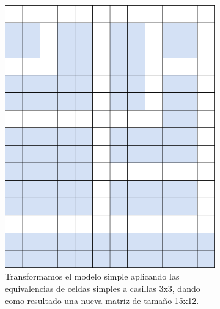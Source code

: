     \begin{figure}[H]
    \centering
        \begin{subfigure}[b]{0.95\textwidth}
            \centering
            \includegraphics[scale=0.375]{img/paso10.png}
            \caption{Transformamos el modelo simple aplicando las equivalencias de celdas simples a casillas 3x3, dando como resultado una nueva matriz de tamaño 15x12.}
        \end{subfigure}
        \par\bigskip
        \begin{subfigure}[b]{0.45\textwidth}
            \centering

\end{subfigure}
\end{figure}
